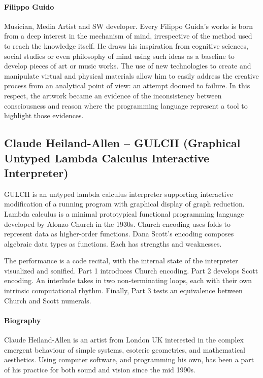 \documentclass[sigplan,10pt,review]{acmart}\settopmatter{printfolios=true}
\begin{document}
\paragraph{Filippo Guido} Musician, Media Artist and SW developer. Every Filippo Guida’s works
is born from a deep interest in the mechanism of mind, irrespective of
the method used to reach the knowledge itself.  He draws his
inspiration from cognitive sciences, social studies or even philosophy
of mind using such ideas as a baseline to develop pieces of art or
music works.  The use of new technologies to create and manipulate
virtual and physical materials allow him to easily address the
creative process from an analytical point of view: an attempt doomed
to failure.  In this respect, the artwork became an evidence of the
inconsistency between consciousness and reason where the programming
language represent a tool to highlight those evidences.


\subsection{Claude Heiland-Allen -- GULCII (Graphical Untyped Lambda Calculus Interactive Interpreter)}

GULCII is an untyped lambda calculus interpreter supporting interactive
modification of a running program with graphical display of graph reduction.
Lambda calculus is a minimal prototypical functional programming language
developed by Alonzo Church in the 1930s.  Church encoding uses folds to
represent data as higher-order functions.  Dana Scott's encoding composes
algebraic data types as functions.  Each has strengths and weaknesses.

The performance is a code recital, with the internal state of the interpreter
visualized and sonified.  Part 1 introduces Church encoding.  Part 2 develops
Scott encoding.  An interlude takes in two non-terminating loops, each with
their own intrinsic computational rhythm.  Finally, Part 3 tests an equivalence
between Church and Scott numerals.

\paragraph{Biography}

Claude Heiland-Allen is an artist from London UK interested in the complex
emergent behaviour of simple systems, esoteric geometries, and mathematical
aesthetics.  Using computer software, and programming his own, has been a
part of his practice for both sound and vision since the mid 1990s.
\end{document}
